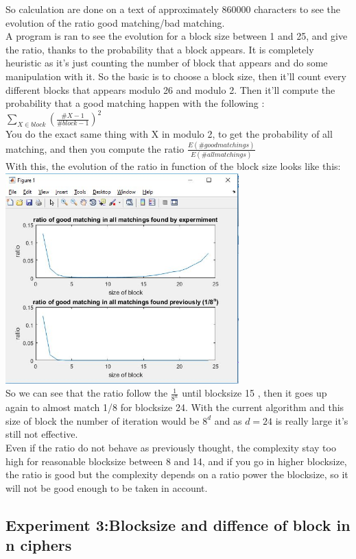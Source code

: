 \documentclass{article}
\begin{document}
So calculation are done on a text of approximately $860000$ characters to see the evolution of the ratio good matching/bad matching.\\
A program is ran to see the evolution for a block size between 1 and 25, and give the ratio, thanks to the probability that a block appears. It is completely heuristic as it's just counting the number of block that appears and do some manipulation with it.
So the basic is to choose a block size, then it'll count every different blocks that appears modulo 26 and modulo 2.
Then it'll compute the probability that a good matching happen with the following : $\sum_{X \in block}({\frac{\#X -1}{\#block -1}})^2 $\\
You do the exact same thing with X in modulo 2, to get the probability of all matching, and then you compute the ratio $\frac{E(\# good matchings)}{E(\# all matchings)}$\\
With this, the evolution of the ratio in function of the block size looks like this:\\
\includegraphics[width=90mm]{ratio.jpg}\\
So we can see that the ratio follow the $\frac{1}{8^n}$ until blocksize 15 , then it goes up again to almost match 1/8 for blocksize 24. With the current algorithm and this size of block the number of iteration would be $8^d$ and as $d = 24$ is really large it's still not effective.\\
Even if the ratio do not behave as previously thought, the complexity stay too high for reasonable blocksize between 8 and 14, and if you go in higher blocksize, the ratio is good but the complexity depends on a ratio power the blocksize, so it will not be good enough to be taken in account.

\subsection{Experiment 3:Blocksize and diffence of block in n ciphers}
\end{document}
